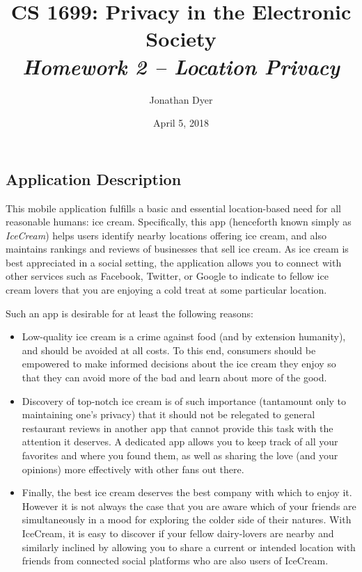 \documentclass{article}
\author{Jonathan Dyer}
\date{April 5, 2018}
\title{CS 1699: Privacy in the Electronic Society \\
        \textit{Homework 2 -- Location Privacy}}
\providecommand{\tightlist}{
    \setlength{\itemsep}{0pt}\setlength{\parskip}{0pt}
}
\begin{document}
\maketitle

\subsection{Application Description}
This mobile application fulfills a basic and essential location-based need for all reasonable humans: ice cream.
Specifically, this app (henceforth known simply as \textit{IceCream}) helps users identify nearby locations offering ice cream, and also maintains rankings and reviews of businesses that sell ice cream.
As ice cream is best appreciated in a social setting, the application allows you to connect with other services such as Facebook, Twitter, or Google to indicate to fellow ice cream lovers that you are enjoying a cold treat at some particular location. \par
Such an app is desirable for at least the following reasons:
\begin{itemize}\tightlist
  \item Low-quality ice cream is a crime against food (and by extension humanity), and should be avoided at all costs. To this end, consumers should be empowered to make informed decisions about the ice cream they enjoy so that they can avoid more of the bad and learn about more of the good.
  \item Discovery of top-notch ice cream is of such importance (tantamount only to maintaining one's privacy) that it should not be relegated to general restaurant reviews in another app that cannot provide this task with the attention it deserves. A dedicated app allows you to keep track of all your favorites and where you found them, as well as sharing the love (and your opinions) more effectively with other fans out there.
  \item Finally, the best ice cream deserves the best company with which to enjoy it. However it is not always the case that you are aware which of your friends are simultaneously in a mood for exploring the colder side of their natures. With IceCream, it is easy to discover if your fellow dairy-lovers are nearby and similarly inclined by allowing you to share a current or intended location with friends from connected social platforms who are also users of IceCream.
\end{itemize}
\end{document}
